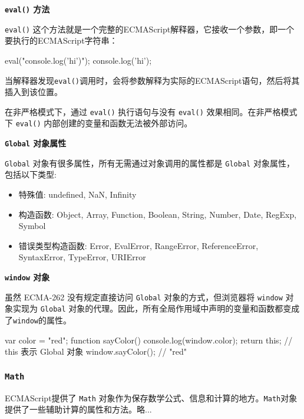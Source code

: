 \noindent\textbf{\texttt{eval()} 方法}

\texttt{eval()} 这个方法就是一个完整的ECMAScript解释器，它接收一个参数，即一个要执行的ECMAScript字符串：
\begin{JavaScript}
eval("console.log('hi')");
console.log('hi');
\end{JavaScript}

当解释器发现\texttt{eval()}调用时，会将参数解释为实际的ECMAScript语句，然后将其插入到该位置。

在非严格模式下，通过 \texttt{eval()} 执行语句与没有 \texttt{eval()} 效果相同。在非严格模式下 \texttt{eval()} 内部创建的变量和函数无法被外部访问。


\noindent\textbf{\texttt{Global} 对象属性}

\texttt{Global} 对象有很多属性，所有无需通过对象调用的属性都是 \texttt{Global} 对象属性，包括以下类型:
\begin{itemize}
    \item 特殊值: undefined, NaN, Infinity
    \item 构造函数: Object, Array, Function, Boolean, String, Number, Date, RegExp, Symbol
    \item 错误类型构造函数: Error, EvalError, RangeError, ReferenceError, SyntaxError, TypeError, URIError
\end{itemize}

\noindent\textbf{\texttt{window} 对象}

虽然 ECMA-262 没有规定直接访问 \texttt{Global} 对象的方式，但浏览器将 \texttt{window} 对象实现为 \texttt{Global} 对象的代理。因此，所有全局作用域中声明的变量和函数都变成了\texttt{window}的属性。

\begin{JavaScript}
var color = "red"; 
function sayColor() {   
    console.log(window.color);
    return this;   // this 表示 Global 对象 
} 
window.sayColor(); // "red" 
\end{JavaScript}

\subsubsection{\texttt{Math}}

ECMAScript提供了 \texttt{Math} 对象作为保存数学公式、信息和计算的地方。\texttt{Math}对象提供了一些辅助计算的属性和方法。略...

\newpage